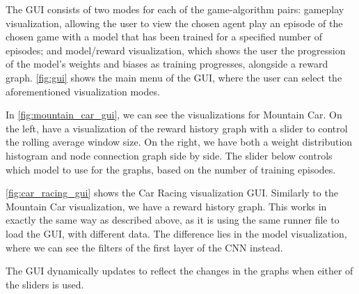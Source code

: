 The GUI consists of two modes for each of the game-algorithm pairs: gameplay
visualization, allowing the user to view the chosen agent play an episode of
the chosen game with a model that has been trained for a specified number of
episodes; and model/reward visualization, which shows the user the progression
of the model's weights and biases as training progresses, alongside a reward
graph. \autoref{fig:gui} shows the main menu of the GUI, where the user can
select the aforementioned visualization modes.



In \autoref{fig:mountain_car_gui}, we can see the visualizations for Mountain
Car. On the left, have a visualization of the reward history graph with a
slider to control the rolling average window size. On the right, we have both a
weight distribution histogram and node connection graph side by side. The
slider below controls which model to use for the graphs, based on the number of
training episodes.

\autoref{fig:car_racing_gui} shows the Car Racing visualization GUI. Similarly to the Mountain Car visualization, we have a reward history graph. This works in exactly the same way as described above, as it is using the same runner file to load the GUI, with different data. The difference lies in the model visualization, where we can see the filters of the first layer of the CNN instead.

The GUI dynamically updates to reflect the changes in the graphs when either of
the sliders is used.




